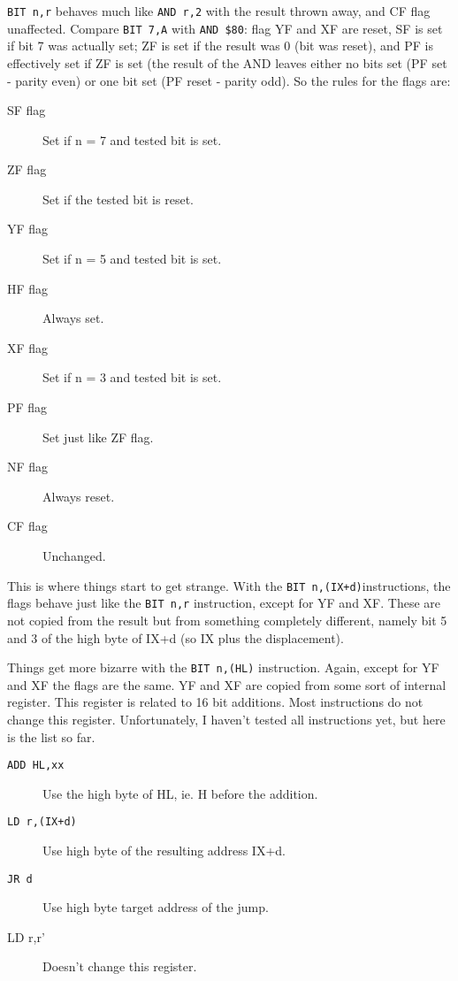 \documentclass[oneside,a4paper]{book}
\begin{document}
{\tt BIT n,r} behaves much like {\tt AND r,2{\raisebox{1ex}{n}}} with the result thrown away, and CF flag unaffected. Compare {\tt BIT 7,A} with {\tt AND \$80}: flag YF and XF are reset, SF is set if bit 7 was actually set; ZF is set if the result was 0 (bit was reset), and PF is effectively set if ZF is set (the result of the AND leaves either no bits set (PF set - parity even) or one bit set (PF reset - parity odd). So the rules for the flags are:

\begin{description}

	\item[SF flag]
	Set if n = 7 and tested bit is set.

	\item[ZF flag]
	Set if the tested bit is reset.

	\item[YF flag]
	Set if n = 5 and tested bit is set.

	\item[HF flag]
	Always set.

	\item[XF flag]
	Set if n = 3 and tested bit is set.

	\item[PF flag]
	Set just like ZF flag.

	\item[NF flag]
	Always reset. 

	\item[CF flag]
	Unchanged.

\end{description}

This is where things start to get strange. With the {\tt BIT n,(IX+d)}instructions, the flags behave just like the {\tt BIT n,r} instruction, except for YF and XF. These are not copied from the result but from something completely different, namely bit 5 and 3 of the high byte of IX+d (so IX plus the displacement).

Things get more bizarre with the {\tt BIT n,(HL)} instruction. Again, except for YF and XF the flags are the same. YF and XF are copied from some sort of internal register. This register is related to 16 bit additions. Most instructions do not change this register. Unfortunately, I haven't tested all instructions yet, but here is the list so far.

\begin{description}

	\item[{\tt ADD HL,xx}]
	Use the high byte of HL, ie. H before the addition.

	\item[{\tt LD r,(IX+d)}]
	Use high byte of the resulting address IX+d.

	\item[{\tt JR d}]
	Use high byte target address of the jump.

	\item[{LD r,r'}]
	Doesn't change this register.

\end{description}
\end{document}
